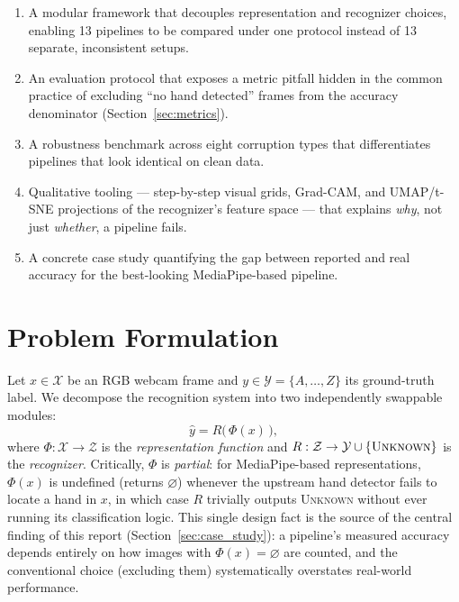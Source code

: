 \documentclass[11pt,a4paper]{article}
\begin{document}
\begin{enumerate}[leftmargin=1.6em]
  \item A modular framework that decouples representation and recognizer
        choices, enabling 13 pipelines to be compared under one protocol
        instead of 13 separate, inconsistent setups.
  \item An evaluation protocol that exposes a metric pitfall hidden in the
        common practice of excluding ``no hand detected'' frames from the
        accuracy denominator (Section~\ref{sec:metrics}).
  \item A robustness benchmark across eight corruption types that
        differentiates pipelines that look identical on clean data.
  \item Qualitative tooling --- step-by-step visual grids, Grad-CAM, and
        UMAP/t-SNE projections of the recognizer's feature space --- that
        explains \emph{why}, not just \emph{whether}, a pipeline fails.
  \item A concrete case study quantifying the gap between reported and real
        accuracy for the best-looking MediaPipe-based pipeline.
\end{enumerate}

\section{Problem Formulation}
\label{sec:framework}

Let $x \in \mathcal{X}$ be an RGB webcam frame and $y \in \mathcal{Y} =
\{A, \dots, Z\}$ its ground-truth label. We decompose the recognition system
into two independently swappable modules:
\begin{equation}
  \hat{y} = R\big(\,\Phi(x)\,\big),
\end{equation}
where $\Phi: \mathcal{X} \rightarrow \mathcal{Z}$ is the \emph{representation
function} and $R: \mathcal{Z} \rightarrow \mathcal{Y} \cup \{\textsc{Unknown}\}$
is the \emph{recognizer}. Critically, $\Phi$ is \emph{partial}: for
MediaPipe-based representations, $\Phi(x)$ is undefined (returns $\varnothing$)
whenever the upstream hand detector fails to locate a hand in $x$, in which
case $R$ trivially outputs \textsc{Unknown} without ever running its
classification logic. This single design fact is the source of the central
finding of this report (Section~\ref{sec:case_study}): a pipeline's measured
accuracy depends entirely on how images with $\Phi(x) = \varnothing$ are
counted, and the conventional choice (excluding them) systematically
overstates real-world performance.
\end{document}
